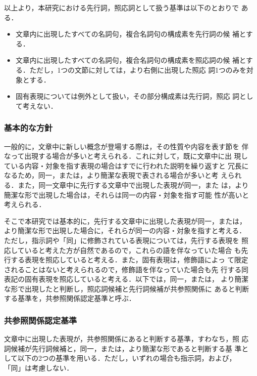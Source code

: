 \documentclass[japanese]{jnlp_1.4}
\begin{document}
   以上より，本研究における先行詞，照応詞として扱う基準は以下のとおりで
   ある．

   \begin{itemize}
    \item 文章内に出現したすべての名詞句，複合名詞句の構成素を先行詞の候
	  補とする．
    \item 文章内に出現したすべての名詞句，複合名詞句の構成素を照応詞の候
	  補とする．ただし，1つの文節に対しては，より右側に出現した照応
	  詞1つのみを対象とする．
    \item 固有表現については例外として扱い，その部分構成素は先行詞，照応
	  詞として考えない．
   \end{itemize}
   

   \subsubsection{基本的な方針}

   一般的に，文章中に新しい概念が登場する際は，その性質や内容を表す節を
   伴なって出現する場合が多いと考えられる．これに対して，既に文章中に出
   現している内容・対象を指す表現の場合はすでに行われた説明を繰り返すと
   冗長になるため，同一，または，より簡潔な表現で表される場合が多いと考
   えられる．また，同一文章中に先行する文章中で出現した表現が同一，また
   は，より簡潔な形で出現した場合は，それらは同一の内容・対象を指す可能
   性が高いと考えられる．

   そこで本研究では基本的に，先行する文章中に出現した表現が同一，または，
   より簡潔な形で出現した場合に，それらが同一の内容・対象を指すと考える．
   ただし，指示詞や「同」に修飾されている表現については，先行する表現を
   照応していると考えた方が自然であるので，これらの語を伴なっていた場合
   も先行する表現を照応していると考える．また，固有表現は，修飾語によっ
   て限定されることはないと考えられるので，修飾語を伴なっていた場合も先
   行する同表記の固有表現を照応していると考える．以下では，同一，または，
   より簡潔な形で出現したと判断し，照応詞候補と先行詞候補が共参照関係に
   あると判断する基準を，共参照関係認定基準と呼ぶ．


   \subsubsection{共参照関係認定基準}
   \label{basis}

   文章中に出現した表現が，共参照関係にあると判断する基準，すわなち，照
   応詞候補が先行詞候補と，同一，または，より簡潔な形であると判断する基
   準として以下の2つの基準を用いる．ただし，いずれの場合も指示詞，および，
   「同」は考慮しない．
\end{document}

